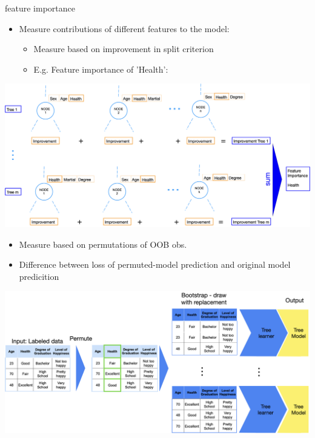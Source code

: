 \documentclass[11pt,compress,t,notes=noshow, xcolor=table]{beamer}
\begin{document}

\begin{vbframe}{feature importance}
\begin{itemize}
\item \small Measure contributions of different features to the model:
    \begin{itemize}
        \item \small Measure based on improvement in split criterion
        \item \small E.g. Feature importance of 'Health':
    \end{itemize}
\end{itemize}    
\includegraphics[width = \textwidth]{slides/forests/figure_man/nutshell-random-forest-feature-importance-split.png}

\vspace{1cm}
\begin{itemize}
    \item \small Measure based on permutations of OOB obs.
    \item \small Difference between loss of permuted-model prediction and original model predicition
\end{itemize}
\includegraphics[width = \textwidth]{slides/forests/figure_man/nutshell-randomforest-OOB_1.png}


\end{vbframe}
\end{document}
